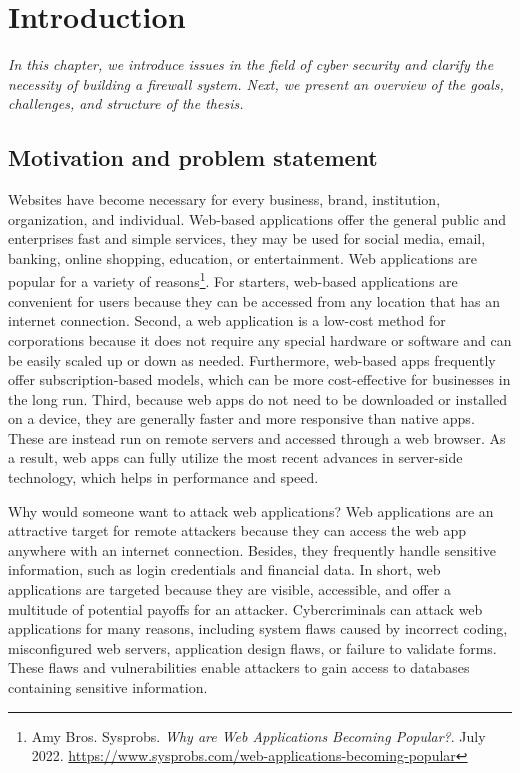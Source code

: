\chapter{Introduction}
\label{chap:introduction} 
	\textit{\hspace{0.5cm}In this chapter, we introduce issues in the field of cyber security and clarify the necessity of building a firewall system. Next, we present an overview of the goals, challenges, and structure of the thesis.}
\minitoc

\section{Motivation and problem statement}
\label{sec:motivation}
\hspace{0.5cm}Websites have become necessary for every business, brand, institution, organization, and individual. Web-based applications offer the general public and enterprises fast and simple services, they may be used for social media, email, banking, online shopping, education, or entertainment. Web applications are popular for a variety of reasons\footnote{Amy Bros. Sysprobs. \textit{Why are Web Applications Becoming Popular?}. July 2022. \url{https://www.sysprobs.com/web-applications-becoming-popular}}. For starters, web-based applications are convenient for users because they can be accessed from any location that has an internet connection. Second, a web application is a low-cost method for corporations because it does not require any special hardware or software and can be easily scaled up or down as needed. Furthermore, web-based apps frequently offer subscription-based models, which can be more cost-effective for businesses in the long run. Third, because web apps do not need to be downloaded or installed on a device, they are generally faster and more responsive than native apps. These are instead run on remote servers and accessed through a web browser. As a result, web apps can fully utilize the most recent advances in server-side technology, which helps in performance and speed. 

Why would someone want to attack web applications? Web applications are an attractive target for remote attackers because they can access the web app anywhere with an internet connection. Besides, they frequently handle sensitive information, such as login credentials and financial data. In short, web applications are targeted because they are visible, accessible, and offer a multitude of potential payoffs for an attacker. Cybercriminals can attack web applications for many reasons, including system flaws caused by incorrect coding, misconfigured web servers, application design flaws, or failure to validate forms. These flaws and vulnerabilities enable attackers to gain access to databases containing sensitive information. 


